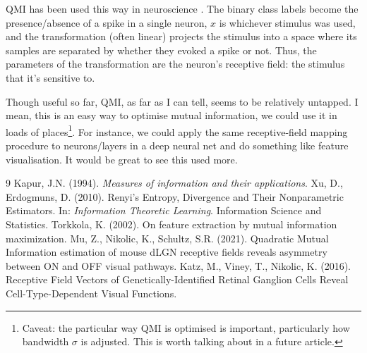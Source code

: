 QMI has been used this way in neuroscience \cite{mu2021, katz2016}. The binary class labels become the presence/absence of a spike in a single neuron, $x$ is whichever stimulus was used, and the transformation (often linear) projects the stimulus into a space where its samples are separated by whether they evoked a spike or not. Thus, the parameters of the transformation are the neuron's receptive field: the stimulus that it's sensitive to.

Though useful so far, QMI, as far as I can tell, seems to be relatively untapped. I mean, this is an easy way to optimise mutual information, we could use it in loads of places\footnote{Caveat: the particular way QMI is optimised is important, particularly how bandwidth $\sigma$ is adjusted. This is worth talking about in a future article.}. For instance, we could apply the same receptive-field mapping procedure to neurons/layers in a deep neural net and do something like feature visualisation. It would be great to see this used more.

\begin{thebibliography}{9}
 Kapur, J.N. (1994). \emph{Measures of information and their applications}.
 Xu, D., Erdogmuns, D. (2010). Renyi's Entropy, Divergence and Their Nonparametric Estimators. In: \emph{Information Theoretic Learning}. Information Science and Statistics.
 Torkkola, K. (2002). On feature extraction by mutual information maximization.
 Mu, Z., Nikolic, K., Schultz, S.R. (2021). Quadratic Mutual Information estimation of mouse dLGN receptive fields reveals asymmetry between ON and OFF visual pathways.
 Katz, M., Viney, T., Nikolic, K. (2016). Receptive Field Vectors of Genetically-Identified Retinal Ganglion Cells Reveal Cell-Type-Dependent Visual Functions.
\end{thebibliography}

